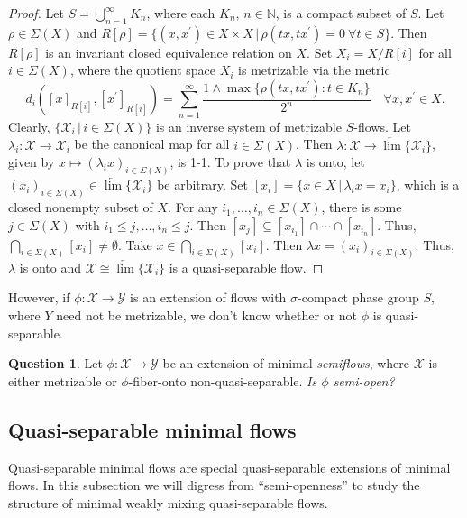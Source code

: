 \documentclass[12pt,final,3p,times]{elsarticle}
\theoremstyle{definition}
\newtheorem{sq}[sthm]{Question}
\numberwithin{equation}{section}
\begin{document}
\begin{proof}
Let $S=\bigcup_{n=1}^\infty K_n$, where each $K_n$, $n\in\mathbb{N}$, is a compact subset of $S$. Let $\rho\in\Sigma(X)$ and $R[\rho]=\{(x,x^\prime)\in X\times X\,|\,\rho(tx,tx^\prime)=0\ \forall t\in S\}$. Then $R[\rho]$ is an invariant closed equivalence relation on $X$. Set $X_i=X/R[i]$ for all $i\in\Sigma(X)$, where the quotient space $X_i$ is metrizable via the metric 
$$
d_i([x]_{R[i]},[x^\prime]_{R[i]})=\sum_{n=1}^\infty\frac{1\wedge\max\{\rho(tx,tx^\prime)\colon t\in K_n\}}{2^n}\quad \forall x,x^\prime\in X.
$$
Clearly, $\{\mathscr{X}_i\,|\,i\in\Sigma(X)\}$ is an inverse system of metrizable $S$-flows. Let $\lambda_i\colon \mathscr{X}\rightarrow\mathscr{X}_i$ be the canonical map for all $i\in\Sigma(X)$. Then
$\lambda\colon\mathscr{X}\rightarrow\underleftarrow{\lim}\{\mathscr{X}_i\}$, given by $x\mapsto(\lambda_ix)_{i\in\Sigma(X)}$,
is 1-1. To prove that $\lambda$ is onto, let $(x_i)_{i\in\Sigma(X)}\in\underleftarrow{\lim}\{\mathscr{X}_i\}$ be arbitrary. Set $[x_i]=\{x\in X\,|\,\lambda_ix=x_i\}$, which is a closed nonempty subset of $X$. For any $i_1,\dotsc,i_n\in\Sigma(X)$, there is some $j\in\Sigma(X)$ with $i_1\le j, \dotsc, i_n\le j$.
Then $[x_j]\subseteq[x_{i_1}]\cap\dotsm\cap[x_{i_n}]$. Thus, $\bigcap_{i\in\Sigma(X)}[x_i]\not=\emptyset$. Take $x\in\bigcap_{i\in\Sigma(X)}[x_i]$. Then $\lambda x=(x_i)_{i\in\Sigma(X)}$. Thus, $\lambda$ is onto and $\mathscr{X}\cong\underleftarrow{\lim}\{\mathscr{X}_i\}$ is a quasi-separable flow.
\end{proof}

However, if $\phi\colon\mathscr{X}\rightarrow\mathscr{Y}$ is an extension of flows with $\sigma$-compact phase group $S$, where $Y$ need not be metrizable, we don't know whether or not $\phi$ is quasi-separable.

\begin{sq}\label{5.2.4}
Let $\phi\colon\mathscr{X}\rightarrow\mathscr{Y}$ be an extension of minimal \textit{semiflows}, where $\mathscr{X}$ is either metrizable or $\phi$-fiber-onto non-quasi-separable. {\it Is $\phi$ semi-open?}
\end{sq}

\subsection{Quasi-separable minimal flows}\label{s5.3}
Quasi-separable minimal flows are special quasi-separable extensions of minimal flows. In this subsection we will digress from ``semi-openness'' to study the structure of minimal weakly mixing quasi-separable flows.
\end{document}
